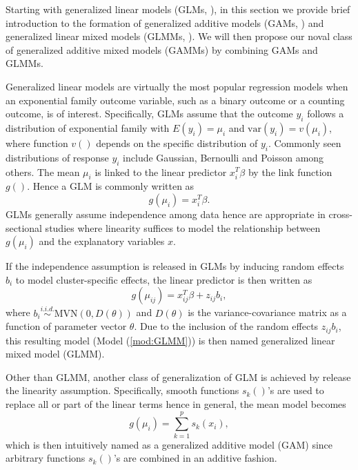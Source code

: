 	Starting with generalized linear models (GLMs, \cite{mccullagh2018generalized}), in this section we provide brief introduction to the formation of generalized additive models (GAMs, \cite{hastie1990generalized}) and generalized linear mixed models (GLMMs, \cite{breslow1993approximate, wolfinger1993generalized}). We will then propose our noval class of generalized additive mixed models (GAMMs) by combining GAMs and GLMMs. 
	
	Generalized linear models are virtually the most popular regression models when an exponential family outcome variable, such as a binary outcome or a counting outcome, is of interest. Specifically, GLMs assume that the outcome $y_i$ follows a distribution of exponential family with $E(y_i)=\mu_i$ and $\text{var}(y_i)=v(\mu_i)$, where function $v()$ depends on the specific distribution of $y_{i}$. Commonly seen distributions of response $y_i$ include Gaussian, Bernoulli and Poisson among others. The mean $\mu_i$ is linked to the linear predictor $x_i^T\beta$ by the link function $g()$. Hence a GLM is commonly written as 
	\begin{equation}\label{mod:GLM}
	g(\mu_i)=x_{i}^T\beta. 
	\end{equation}
	GLMs generally assume independence among data hence are appropriate in cross-sectional studies where linearity suffices to model the relationship between $g(\mu_i)$ and  the explanatory variables $x$. 
	
	If the independence assumption is released in GLMs by inducing random effects $b_i$ to model cluster-specific effects, the linear predictor is then written as
	\begin{equation}\label{mod:GLMM}
	g(\mu_{ij})=x_{ij}^T\beta + z_{ij}b_i, 
	\end{equation}
	where $b_i \stackrel{i.i.d.}{\sim} \text{MVN}(0,D(\theta))$ and $D(\theta)$ is the variance-covariance matrix as a function of parameter vector $\theta$. Due to the inclusion of the random effects $z_{ij}b_i$, this resulting model (Model (\ref{mod:GLMM})) is then named generalized linear mixed model (GLMM). 
	
	Other than GLMM, another class of generalization of GLM is achieved by release the linearity assumption. Specifically, smooth functions $s_k()$'s are used to replace all or part of the linear terms hence in general, the mean model becomes
	\begin{equation}\label{mod:GAM}
	g(\mu_i)=\sum_{k=1}^p s_k(x_i), 
	\end{equation} 
	which is then intuitively named as a generalized additive model (GAM) since arbitrary functions $s_k()$'s are combined in an additive fashion.
	
